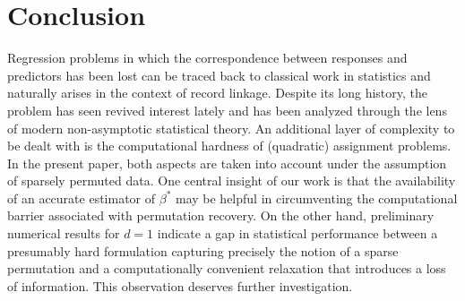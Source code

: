 \documentclass[11pt]{article}
\begin{document}

\section{Conclusion}\label{sec:conclusion}
Regression problems in which the correspondence between responses and predictors has been lost can be traced back to classical work in statistics and naturally arises in the context of record linkage. Despite its long history, the problem has seen revived interest lately and has been analyzed through the lens of modern non-asymptotic statistical theory. An additional layer of complexity to be dealt with is the computational hardness of (quadratic) assignment problems. In the present paper, both aspects are taken into account under the assumption of sparsely permuted data. One central insight of our work is that the availability of an accurate estimator of $\beta^*$ may be helpful in circumventing the computational barrier associated with permutation recovery. On the other hand, preliminary numerical results for $d = 1$ indicate a gap in statistical performance between a presumably hard formulation capturing precisely the notion of a sparse permutation and a computationally convenient relaxation that introduces a loss of information. This observation deserves further investigation. 
\end{document}
